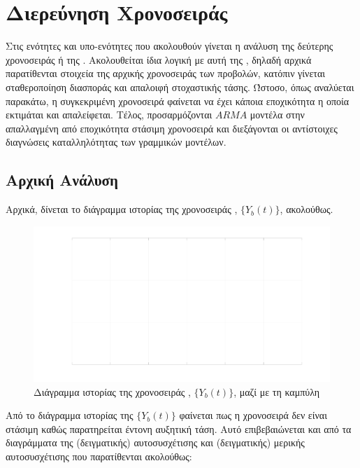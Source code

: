 \chapter{Διερεύνηση Χρονοσειράς }
\label{ch:step3}
\thispagestyle{fancy}

Στις ενότητες και υπο-ενότητες που ακολουθούν γίνεται η ανάλυση της δεύτερης χρονοσειράς ή της . Ακολουθείται ίδια λογική με αυτή της , δηλαδή αρχικά παρατίθενται στοιχεία της αρχικής χρονοσειράς των προβολών, κατόπιν γίνεται σταθεροποίηση διασποράς και απαλοιφή στοχαστικής τάσης. Ώστοσο, όπως αναλύεται παρακάτω, η συγκεκριμένη χρονοσειρά φαίνεται να έχει κάποια εποχικότητα η οποία εκτιμάται και απαλείφεται. Τέλος, προσαρμόζονται $ARMA$ μοντέλα στην απαλλαγμένη από εποχικότητα στάσιμη χρονοσειρά και διεξάγονται οι αντίστοιχες διαγνώσεις καταλληλότητας των γραμμικών μοντέλων.

\section{Αρχική Ανάλυση}

Αρχικά, δίνεται το διάγραμμα ιστορίας της χρονοσειράς , $\{Y_b(t)\}$, ακολούθως.

\begin{figure}[H]
    \begin{center}
        \includegraphics[width=\textwidth]{plots/yb_history.svg.pdf}
        \caption{Διάγραμμα ιστορίας της χρονοσειράς , $\{Y_b(t)\}$, μαζί με τη καμπύλη }
        \label{fig:yb_history}
    \end{center}
\end{figure}

Από το διάγραμμα ιστορίας της $\{Y_b(t)\}$ φαίνεται πως η χρονοσειρά δεν είναι στάσιμη καθώς παρατηρείται έντονη αυξητική τάση. Αυτό επιβεβαιώνεται και από τα διαγράμματα της (δειγματικής) αυτοσυσχέτισης και (δειγματικής) μερικής αυτοσυσχέτισης που παρατίθενται ακολούθως:

